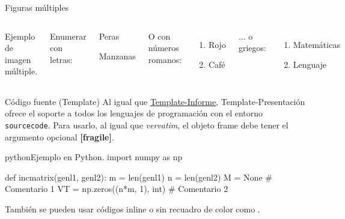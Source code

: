 
\begin{frame}{Figuras múltiples}
	\begin{columns}[c]
		\begin{images}{Ejemplo de imagen múltiple.}
			\imagesnewline
		\end{images}
		
		
		Enumerar con letras:
		
		\begin{enumeratebf}[label=\alph*) ] %
			\item Peras
			\item Manzanas
		\end{enumeratebf}
		
		O con números romanos:
		
		\begin{enumerate}[label=\roman*) ]
			\item Rojo
			\item Café
		\end{enumerate}
		
		$\ldots$ o griegos:
		
		\begin{enumerate}[label=\greek*) ]
			\item Matemáticas
			\item Lenguaje
		\end{enumerate}
	\end{columns}
\end{frame}


\begin{frame}[fragile]{Código fuente (Template)}
	Al igual que \href{https://template-latex.github.io/informe}{Template-Informe}, Template-Presentación ofrece el soporte a todos los lenguajes de programación con el entorno \texttt{sourcecode}. Para usarlo, al igual que \textit{vervatim}, el objeto frame debe tener el argumento opcional \textbf{[fragile]}.

\begin{sourcecode}{python}{Ejemplo en Python.}
import numpy as np

def incmatrix(genl1, genl2):
    m = len(genl1)
    n = len(genl2)
    M = None # Comentario 1
    VT = np.zeros((n*m, 1), int) # Comentario 2
\end{sourcecode}
	
	También se pueden usar códigos inline  o sin recuadro de color como .
\end{frame}

